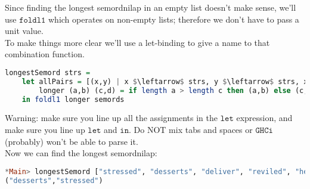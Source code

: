 \documentclass[a4paper,12pt]{article}
\newcommand{\kwa}[1]{\mathtt{#1}}
\begin{document}
\noindent
Since finding the longest semordnilap in an empty list doesn't make sense, we'll use $\kwa{foldl1}$ which operates on non-empty lists; therefore we don't have to pass a unit value. \\

\noindent
To make things more clear we'll use a let-binding to give a name to that combination function.

\begin{lstlisting}[language=Haskell]
longestSemord strs =
	let allPairs = [(x,y) | x $\leftarrow$ strs, y $\leftarrow$ strs, x /= y, reverse x == y]
        longer (a,b) (c,d) = if length a > length c then (a,b) else (c,d)
    in foldl1 longer semords
\end{lstlisting}

\noindent
Warning: make sure you line up all the assignments in the $\kwa{let}$ expression, and make sure you line up $\kwa{let}$ and $\kwa{in}$. Do NOT mix tabs and spaces or $\kwa{GHCi}$ (probably) won't be able to parse it. \\

\noindent
Now we can find the longest semordnilap:

\begin{lstlisting}[language=Haskell]
*Main> longestSemord ["stressed", "desserts", "deliver", "reviled", "hello"]
("desserts","stressed")
\end{lstlisting}
\end{document}
